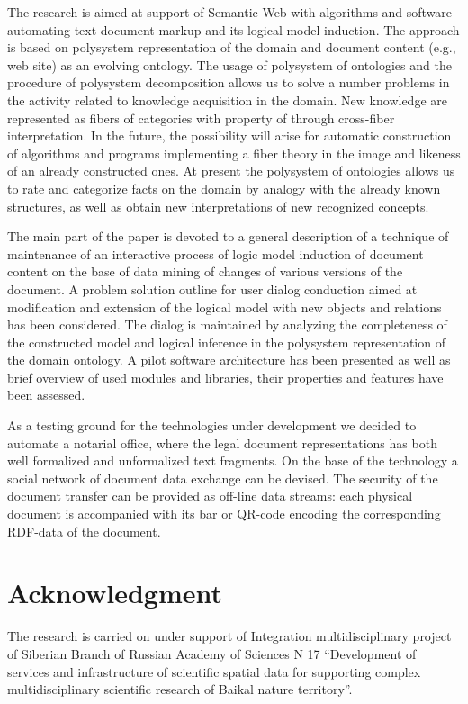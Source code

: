 \documentclass[conference]{IEEEtran}
\begin{document}
The research is aimed at support of Semantic Web with algorithms and software automating text document markup and its logical model induction.  The approach is based on polysystem representation of the domain and document content (e.g., web site) as an evolving ontology.  The usage of polysystem of ontologies and the procedure of polysystem decomposition \cite{father} allows us to solve a number problems in the activity related to knowledge acquisition in the domain.  New knowledge are represented as fibers of categories with property of through cross-fiber interpretation.  In the future, the possibility will arise for automatic construction of algorithms and programs implementing a fiber theory in the image and likeness of an already constructed ones.  At present the polysystem of ontologies allows us to rate and categorize facts on the domain by analogy with the already known structures, as well as obtain new interpretations of new recognized concepts.

The main part of the paper is devoted to a general description of a technique of maintenance of an interactive process of logic model induction of document content on the base of data mining of changes of various versions of the document.  A problem solution outline for user dialog conduction aimed at modification and extension of the logical model with new objects and relations has been considered.  The dialog is maintained by analyzing the completeness of the constructed model and logical inference in the polysystem representation of the domain ontology. A pilot software architecture has been presented as well as brief overview of used modules and libraries, their properties and features have been assessed.

As a testing ground for the technologies under development we decided to automate a notarial office, where the legal document representations has both well formalized and unformalized text fragments.  On the base of the technology a social network of document data exchange can be devised. The security of the document transfer can be provided as off-line data streams: each physical document is accompanied with its bar or QR-code encoding the corresponding RDF-data of the document.


\section*{Acknowledgment}
The research is carried on under support of Integration multidisciplinary project of Siberian Branch of Russian Academy of Sciences N 17 “Development of services and infrastructure of scientific spatial data for supporting complex multidisciplinary scientific research of Baikal nature territory”.
\end{document}
